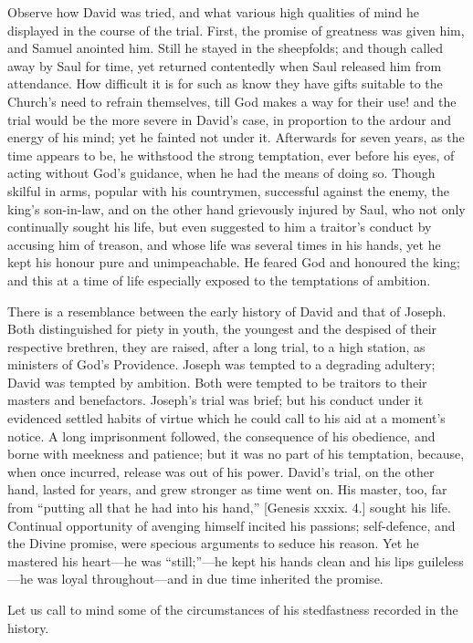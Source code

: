 Observe how David was tried, and what various high qualities of
mind he displayed in the course of the trial. First, the promise of
greatness was given him, and Samuel anointed him. Still he stayed in
the sheepfolds; and though called away by Saul for time, yet returned
contentedly when Saul released him from attendance. How difficult it
is for such as know they have gifts suitable to the Church's need to
refrain themselves, till God makes a way for their use! and the trial
would be the more severe in David's case, in proportion to the ardour
and energy of his mind; yet he fainted not under it. Afterwards for
seven years, as the time appears to be, he withstood the strong
temptation, ever before his eyes, of acting without God's guidance,
when he had the means of doing so. Though skilful in arms, popular
with his countrymen, successful against the enemy, the king's
son-in-law, and on the other hand grievously injured by Saul, who not
only continually sought his life, but even suggested to him a traitor's
conduct by accusing him of treason, and whose life was several times
in his hands, yet he kept his honour pure and unimpeachable. He feared
God and honoured the king; and this at a time of life especially
exposed to the temptations of ambition.

There is a resemblance between the early history of David and that
of Joseph. Both distinguished for piety in youth, the youngest and the
despised of their respective brethren, they are raised, after a long
trial, to a high station, as ministers of God's Providence. Joseph was
tempted to a degrading adultery; David was tempted by ambition. Both
were tempted to be traitors to their masters and benefactors. Joseph's
trial was brief; but his conduct under it evidenced settled habits of
virtue which he could call to his aid at a moment's notice. A long
imprisonment followed, the consequence of his obedience, and borne
with meekness and patience; but it was no part of his temptation,
because, when once incurred, release was out of his power. David's
trial, on the other hand, lasted for years, and grew stronger as time
went on. His master, too, far from ``putting all that he had into
his hand,'' [Genesis xxxix. 4.] sought his life. Continual
opportunity of avenging himself incited his passions; self-defence,
and the Divine promise, were specious arguments to seduce his reason.
Yet he mastered his heart—he was ``still;''—he kept his
hands clean and his lips guileless—he was loyal throughout—and in
due time inherited the promise.

Let us call to mind some of the circumstances of his stedfastness
recorded in the history.

